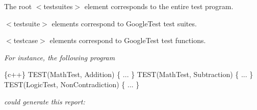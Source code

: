 {\itshape 
\begin{DoxyItemize}
\item The root {\ttfamily $<$testsuites$>$} element corresponds to the entire test program.
\item {\ttfamily $<$testsuite$>$} elements correspond to Google\+Test test suites.
\item {\ttfamily $<$testcase$>$} elements correspond to Google\+Test test functions.
\end{DoxyItemize}}

{\itshape For instance, the following program}

{\itshape 
\begin{DoxyCode}
\{c++\}
TEST(MathTest, Addition) \{ ... \}
TEST(MathTest, Subtraction) \{ ... \}
TEST(LogicTest, NonContradiction) \{ ... \}
\end{DoxyCode}
}

{\itshape could generate this report\+:}

